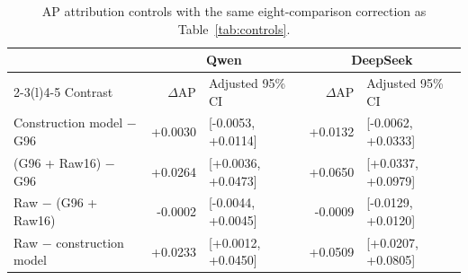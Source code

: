\begin{table}[t]
\centering\small
\caption{AP attribution controls with the same eight-comparison correction as Table~\ref{tab:controls}.}
\label{tab:controls-ap}
\setlength{\tabcolsep}{4pt}
\begin{tabular}{@{}lrlrl@{}}
\toprule
& \multicolumn{2}{c}{Qwen} & \multicolumn{2}{c}{DeepSeek}\\\cmidrule(lr){2-3}\cmidrule(l){4-5} Contrast & $\Delta$AP & Adjusted 95\% CI & $\Delta$AP & Adjusted 95\% CI\\
\midrule
Construction model $-$ G96 & +0.0030 & [-0.0053, +0.0114] & +0.0132 & [-0.0062, +0.0333]\\
(G96 + Raw16) $-$ G96 & +0.0264 & [+0.0036, +0.0473] & +0.0650 & [+0.0337, +0.0979]\\
Raw $-$ (G96 + Raw16) & -0.0002 & [-0.0044, +0.0045] & -0.0009 & [-0.0129, +0.0120]\\
Raw $-$ construction model & +0.0233 & [+0.0012, +0.0450] & +0.0509 & [+0.0207, +0.0805]\\
\bottomrule
\end{tabular}
\end{table}
